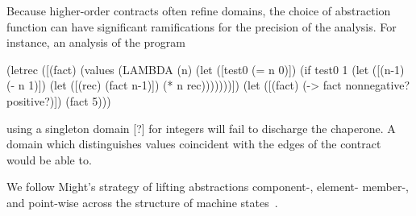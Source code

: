 Because higher-order contracts often refine domains, the choice of abstraction function can have significant ramifications for the precision of the analysis.
For instance, an analysis of the program
\begin{schemedisplay}
(letrec ([(fact) (values (LAMBDA (n)
                          (let ([test0 (= n 0)])
                            (if test0
                                1
                                (let ([(n-1) (- n 1)])
                                  (let ([(rec) (fact n-1)])
                                    (* n rec)))))))])
  (let ([(fact) (-> fact nonnegative? positive?)])
    (fact 5)))
\end{schemedisplay}
using a singleton domain [?] for integers will fail to discharge the chaperone.
A domain which distinguishes values coincident with the edges of the contract would be able to.

We follow Might's strategy of lifting abstractions component-, element- member-, and point-wise across the structure of machine states~\cite{van2010abstracting}.

\newcommand{\astxclass}[4]{$#1\in\widehat{\mathbf{#2}}$ &::=& #3 & #4}
\newcommand{\aks}[0]{\hat{\gamma}^*}





